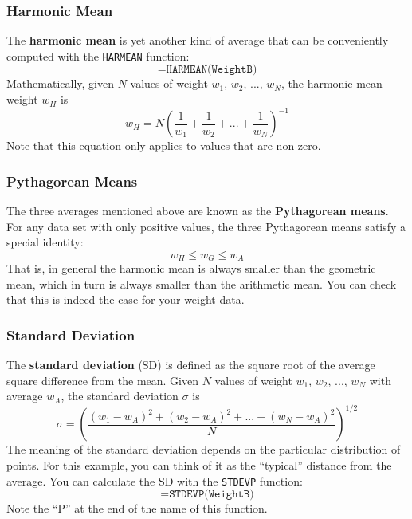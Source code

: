 \subsubsection{Harmonic Mean}
%
The \textbf{harmonic mean} is yet another kind of average that can be conveniently computed with the \texttt{HARMEAN} function:
\begin{equation}
    \texttt{=HARMEAN(WeightB)}
\end{equation}
Mathematically, given $N$ values of weight $w_{1}$, $w_{2}$, ..., $w_{N}$, the harmonic mean weight $w_{H}$ is
\begin{equation}
    w_{H} = N \left( \frac{1}{w_{1}} + \frac{1}{w_{2}} + ... + \frac{1}{w_{N}} \right)^{-1}
\end{equation}
Note that this equation only applies to values that are non-zero.
%
\subsubsection{Pythagorean Means}
%
The three averages mentioned above are known as the \textbf{Pythagorean means}. For any data set with only positive values, the three Pythagorean means satisfy a special identity:
\begin{equation}
    w_{H} \leq w_{G} \leq w_{A}
\end{equation}
That is, in general the harmonic mean is always smaller than the geometric mean, which in turn is always smaller than the arithmetic mean. You can check that this is indeed the case for your weight data.
%
\subsubsection{Standard Deviation}
%
The \textbf{standard deviation} (SD) is defined as the square root of the average square difference from the mean. Given $N$ values of weight $w_{1}$, $w_{2}$, ..., $w_{N}$ with average $w_{A}$, the standard deviation $\sigma$ is
\begin{equation}
    \sigma = \left( \frac{(w_{1} - w_{A})^{2} + (w_{2} - w_{A})^{2} + ... + (w_{N} - w_{A})^{2}}{N}  \right)^{1/2}
\end{equation}
The meaning of the standard deviation depends on the particular distribution of points. For this example, you can think of it as the ``typical'' distance from the average. You can calculate the SD with the \texttt{STDEVP} function:
\begin{equation}
    \texttt{=STDEVP(WeightB)}
\end{equation}
Note the ``P'' at the end of the name of this function.

